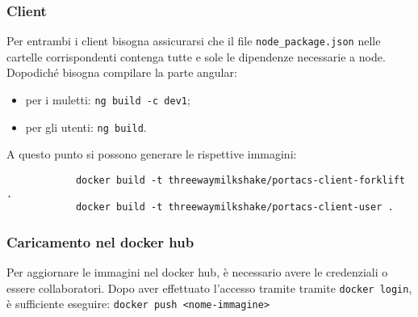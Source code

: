     \subsubsection{Client}
        Per entrambi i client bisogna assicurarsi che il file \texttt{node\_package.json} nelle cartelle corrispondenti contenga tutte e sole le dipendenze necessarie a node. Dopodiché bisogna compilare la parte angular:
        \begin{itemize}
            \item per i muletti: \texttt{ng build -c dev1};
            \item per gli utenti: \texttt{ng build}.
        \end{itemize}
        A questo punto si possono generare le rispettive immagini:
        \begin{verbatim}
            docker build -t threewaymilkshake/portacs-client-forklift .
            docker build -t threewaymilkshake/portacs-client-user .
        \end{verbatim}


    \subsubsection{Caricamento nel docker hub}
        \noindent Per aggiornare le immagini nel docker hub, è necessario avere le credenziali o essere collaboratori. Dopo aver effettuato l'accesso tramite tramite \texttt{docker login}, è sufficiente eseguire: \texttt{docker {push} <nome-immagine>}













